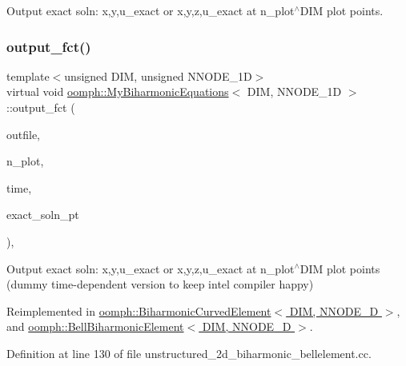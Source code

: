 Output exact soln\+: x,y,u\+\_\+exact or x,y,z,u\+\_\+exact at n\+\_\+plot$^\wedge$\+D\+IM plot points. 

\mbox{\label{classoomph_1_1MyBiharmonicEquations_a95b35b18fac5212ade1a81c26657bcdb}} 
\subsubsection{\texorpdfstring{output\+\_\+fct()}{output\_fct()}\hspace{0.1cm}{\footnotesize\ttfamily [3/4]}}
{\footnotesize\ttfamily template$<$unsigned D\+IM, unsigned N\+N\+O\+D\+E\+\_\+1D$>$ \\
virtual void \hyperlink{classoomph_1_1MyBiharmonicEquations}{oomph\+::\+My\+Biharmonic\+Equations}$<$ D\+IM, N\+N\+O\+D\+E\+\_\+1D $>$\+::output\+\_\+fct (\begin{DoxyParamCaption}\item[{std\+::ostream \&}]{outfile,  }\item[{const unsigned \&}]{n\+\_\+plot,  }\item[{const double \&}]{time,  }\item[{Finite\+Element\+::\+Unsteady\+Exact\+Solution\+Fct\+Pt}]{exact\+\_\+soln\+\_\+pt }\end{DoxyParamCaption})\hspace{0.3cm}{\ttfamily [inline]}, {\ttfamily [virtual]}}



Output exact soln\+: x,y,u\+\_\+exact or x,y,z,u\+\_\+exact at n\+\_\+plot$^\wedge$\+D\+IM plot points (dummy time-\/dependent version to keep intel compiler happy) 



Reimplemented in \hyperlink{classoomph_1_1BiharmonicCurvedElement_a50187fb5a3a0a5905590ed7cd6780211}{oomph\+::\+Biharmonic\+Curved\+Element$<$ D\+I\+M, N\+N\+O\+D\+E\+\_\+D $>$}, and \hyperlink{classoomph_1_1BellBiharmonicElement_a35c7af5c86baeb3787eaf87e2401ea6c}{oomph\+::\+Bell\+Biharmonic\+Element$<$ D\+I\+M, N\+N\+O\+D\+E\+\_\+D $>$}.



Definition at line 130 of file unstructured\+\_\+2d\+\_\+biharmonic\+\_\+bellelement.\+cc.

